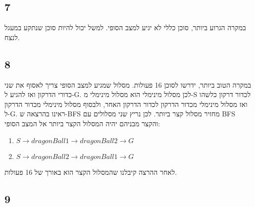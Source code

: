 \documentclass{article}
\begin{document}
\subsection*{7}
במקרה הגרוע ביותר, סוכן כללי לא יגיע למצב הסופי. למשל יכול להיות סוכן שנתקע במעגל לנצח.
\subsection*{8}
במקרה הטוב ביותר, ידרשו לסוכן 16 פעולות. מסלול שמגיע למצב הסופי צריך לאסוף את שני כדורי הדרקון ואז להגיע ל-G. לכן מסלול מינימלי הוא מסלול מינימלי מ-S לכדור דרקון כלשהו ואז מסלול מינימלי מכדור הדרקון לכדור הדרקון האחר, ולבסוף מסלול מינימלי מכדור הדרקון ל-G. ראינו בהרצאה ש-BFS מחזיר מסלול קצר ביותר. לכן נריץ שני מסלולים עם BFS והקצר מבניהם יהיה המסלול הקצר ביותר אל המצב הסופי:
\begin{enumerate}
\item $S \rightarrow dragonBall1 \rightarrow dragonBall2 \rightarrow G$
\item $S \rightarrow dragonBall2 \rightarrow dragonBall1 \rightarrow G$
\end{enumerate}
לאחר ההרצה קיבלנו שהמסלול הקצר הוא באורך של 16 פעולות.

\subsection*{9}
\end{document}
